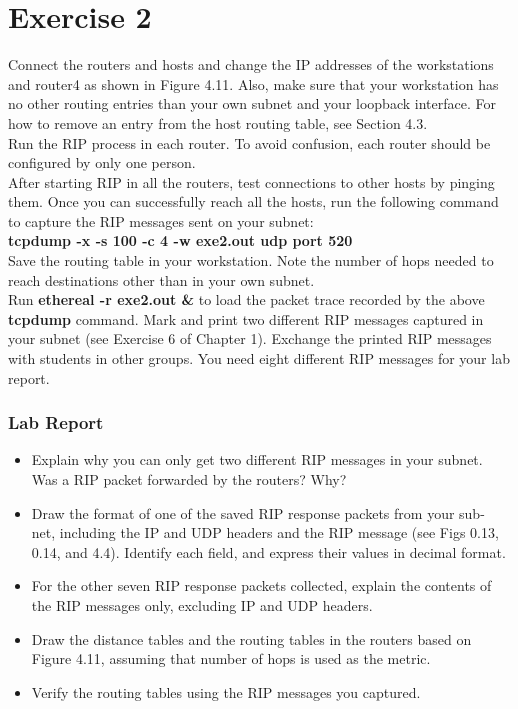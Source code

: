 \documentclass[10pt,a4paper]{article}
\numberwithin{equation}{section}
\numberwithin{figure}{section}
\numberwithin{table}{section}
\begin{document}
    \section{Exercise 2}
    Connect the routers and hosts and change the IP addresses of the workstations and router4 as shown in Figure 4.11.
    Also, make sure that your workstation has no other routing entries than your own subnet and your loopback interface.
    For how to remove an entry from the host routing table, see Section 4.3. \\
    Run the RIP process in each router.
    To avoid confusion, each router should be configured by only one person. \\
    After starting RIP in all the routers, test connections to other hosts by pinging them.
    Once you can successfully reach all the hosts, run the following command to capture the RIP messages sent on your subnet: \\
    \textbf{tcpdump -x -s 100 -c 4 -w exe2.out udp port 520} \\
    Save the routing table in your workstation.
    Note the number of hops needed to reach destinations other than in your own subnet. \\
    Run \textbf{ethereal -r exe2.out \&} to load the packet trace recorded by the above \textbf{tcpdump} command.
    Mark and print two different RIP messages captured in your subnet (see Exercise 6 of Chapter 1).
    Exchange the printed RIP messages with students in other groups.
    You need eight different RIP messages for your lab report.
    \subsubsection*{Lab Report}
    \begin{itemize}
        \setlength{\itemindent}{0pt}
        \item Explain why you can only get two different RIP messages in your subnet.
        Was a RIP packet forwarded by the routers?
        Why?
        \item Draw the format of one of the saved RIP response packets from your sub- net, including the IP and UDP headers and the RIP message (see Figs 0.13, 0.14, and 4.4). Identify each field, and express their values in decimal format.
        \item For the other seven RIP response packets collected, explain the contents of the RIP messages only, excluding IP and UDP headers.
    \end{itemize}
    \begin{itemize}
        \setlength{\itemindent}{0pt}
        \item Draw the distance tables and the routing tables in the routers based on Figure 4.11, assuming that number of hops is used as the metric.
        \item Verify the routing tables using the RIP messages you captured.
    \end{itemize}
\end{document}
